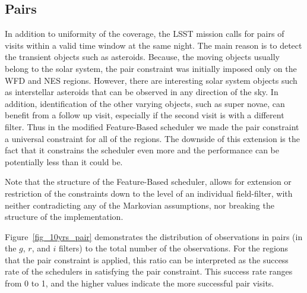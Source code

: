 \documentclass[12pt]{aastex62}
\theoremstyle{definition}
\begin{document}
\subsection{Pairs}
In addition to uniformity of the coverage, the LSST mission calls for pairs of visits within a valid time window at the same night. The main reason is to detect the transient objects such as asteroids. Because, the moving objects usually belong to the solar system, the pair constraint was initially imposed only on the WFD and NES regions. However, there are interesting solar system objects such as interstellar asteroids that can be observed in any direction of the sky. In addition, identification of the other varying objects, such as super novae, can benefit from a follow up visit, especially if the second visit is with a different filter. Thus in the modified Feature-Based scheduler we made the pair constraint a universal constraint for all of the regions. The downside of this extension is the fact that it constrains the scheduler even more and the performance can be potentially less than it could be. 

Note that the structure of the Feature-Based scheduler, allows for extension or restriction of the constraints down to the level of an individual field-filter, with neither contradicting any of the Markovian assumptions, nor breaking the structure of the implementation. 

Figure~\ref{fig_10yrs_pair} demonstrates the distribution of observations in pairs (in the $g$, $r$, and $i$ filters) to the total number of the observations. For the regions that the pair constraint is applied, this ratio can be interpreted as the success rate of the schedulers in satisfying the pair constraint. This success rate ranges from 0 to 1, and the higher values indicate the more successful pair visits.
\end{document}
